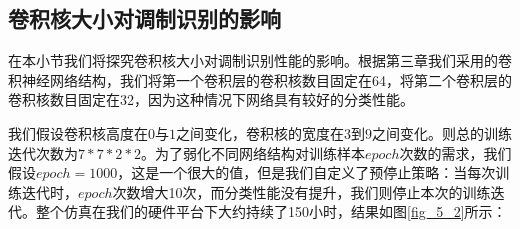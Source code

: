 \subsection{卷积核大小对调制识别的影响}
在本小节我们将探究卷积核大小对调制识别性能的影响。根据第三章我们采用的卷积神经网络结构，我们将第一个卷积层的卷积核数目固定在64，将第二个卷积层的卷积核数目固定在32，因为这种情况下网络具有较好的分类性能。\par
我们假设卷积核高度在$0$与$1$之间变化，卷积核的宽度在$3$到$9$之间变化。则总的训练迭代次数为$7 * 7 * 2 * 2$。为了弱化不同网络结构对训练样本$epoch$次数的需求，我们假设$epoch=1000$，这是一个很大的值，但是我们自定义了预停止策略：当每次训练迭代时，$epoch$次数增大10次，而分类性能没有提升，我们则停止本次的训练迭代。整个仿真在我们的硬件平台下大约持续了150小时，结果如图\ref{fig_5_2}所示：\par
